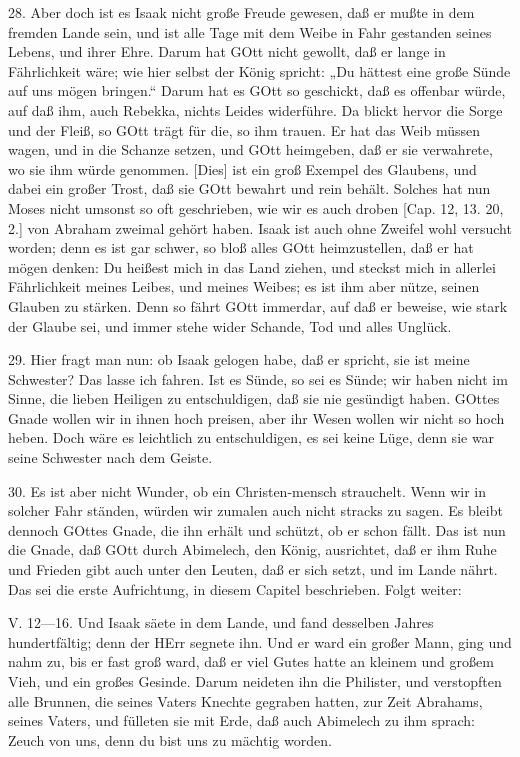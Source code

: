 28. Aber doch ist es Isaak nicht große Freude gewesen, daß er mußte in dem fremden Lande sein, und ist alle Tage mit dem Weibe in Fahr gestanden seines Lebens, und ihrer Ehre. Darum hat GOtt nicht gewollt, daß er lange in Fährlichkeit wäre; wie hier selbst der König spricht: „Du hättest eine große Sünde auf uns mögen bringen.“ Darum hat es GOtt so geschickt, daß es offenbar würde, auf daß ihm, auch Rebekka, nichts Leides widerführe. Da blickt hervor die Sorge und der Fleiß, so GOtt trägt für die, so ihm trauen. Er hat das Weib müssen wagen, und in die Schanze setzen, und GOtt heimgeben, daß er sie verwahrete, wo sie ihm würde genommen. [Dies] ist ein groß Exempel des Glaubens, und dabei ein großer Trost, daß sie GOtt bewahrt und rein behält. Solches hat nun Moses nicht umsonst so oft geschrieben, wie wir es auch droben [Cap. 12, 13. 20, 2.] von Abraham zweimal gehört haben. Isaak ist auch ohne Zweifel wohl versucht worden; denn es ist gar schwer, so bloß alles GOtt heimzustellen, daß er hat mögen denken: Du heißest mich in das Land ziehen, und steckst mich in allerlei Fährlichkeit meines Leibes, und meines Weibes; es ist ihm aber nütze, seinen Glauben zu stärken. Denn so fährt GOtt immerdar, auf daß er beweise, wie stark der Glaube sei, und immer stehe wider Schande, Tod und alles Unglück.

29. Hier fragt man nun: ob Isaak gelogen habe, daß er spricht, sie ist meine Schwester? Das lasse ich fahren. Ist es Sünde, so sei es Sünde; wir haben nicht im Sinne, die lieben Heiligen zu entschuldigen, daß sie nie gesündigt haben. GOttes Gnade wollen wir in ihnen hoch preisen, aber ihr Wesen wollen wir nicht so hoch heben. Doch wäre es leichtlich zu entschuldigen, es sei keine Lüge, denn sie war seine Schwester nach dem Geiste.

30. Es ist aber nicht Wunder, ob ein Christen-mensch strauchelt. Wenn wir in solcher Fahr ständen, würden wir zumalen auch nicht stracks zu sagen. Es bleibt dennoch GOttes Gnade, die ihn erhält und schützt, ob er schon fällt. Das ist nun die Gnade, daß GOtt durch Abimelech, den König, ausrichtet, daß er ihm Ruhe und Frieden gibt auch unter den Leuten, daß er sich setzt, und im Lande nährt. Das sei die erste Aufrichtung, in diesem Capitel beschrieben. Folgt weiter:

\begin{schriftzitat}
V. 12—16. Und Isaak säete in dem Lande, und fand desselben Jahres hundertfältig; denn der HErr segnete ihn. Und er ward ein großer Mann, ging und nahm zu, bis er fast groß ward, daß er viel Gutes hatte an kleinem und großem Vieh, und ein großes Gesinde. Darum neideten ihn die Philister, und verstopften alle Brunnen, die seines Vaters Knechte gegraben hatten, zur Zeit Abrahams, seines Vaters, und fülleten sie mit Erde, daß auch Abimelech zu ihm sprach: Zeuch von uns, denn du bist uns zu mächtig worden.
\end{schriftzitat}


